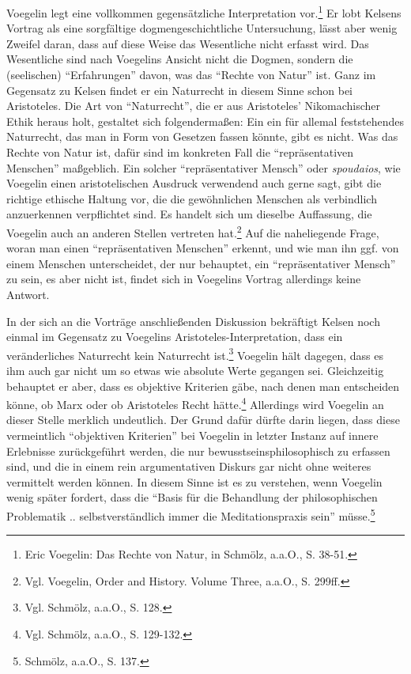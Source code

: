 \documentclass[12pt,a4paper,ngerman]{article}
\begin{document}
Voegelin legt eine vollkommen gegensätzliche Interpretation
vor.\footnote{Eric Voegelin: Das Rechte von Natur, in Schmölz, a.a.O.,
  S. 38-51.} Er lobt Kelsens Vortrag als eine sorgfältige
dogmengeschichtliche Untersuchung, lässt aber wenig Zweifel daran,
dass auf diese Weise das Wesentliche nicht erfasst wird. Das
Wesentliche sind nach Voegelins Ansicht nicht die Dogmen, sondern die
(seelischen) "`Erfahrungen"' davon, was das "`Rechte von Natur"' ist.
Ganz im Gegensatz zu Kelsen findet er ein Naturrecht in diesem Sinne
schon bei Aristoteles. Die Art von "`Naturrecht"', die er aus
Aristoteles' Nikomachischer Ethik heraus holt, gestaltet sich
folgendermaßen: Ein ein für allemal feststehendes Naturrecht, das man
in Form von Gesetzen fassen könnte, gibt es nicht. Was das Rechte von
Natur ist, dafür sind im konkreten Fall die "`repräsentativen
Menschen"' maßgeblich. Ein solcher "`repräsentativer Mensch"' oder
{\em spoudaios}, wie Voegelin einen aristotelischen Ausdruck
verwendend auch gerne sagt, gibt die richtige ethische Haltung vor,
die die gewöhnlichen Menschen als verbindlich anzuerkennen
verpflichtet sind. Es handelt sich um dieselbe Auffassung, die
Voegelin auch an anderen Stellen vertreten hat.\footnote{Vgl.
  Voegelin, Order and History. Volume Three, a.a.O., S. 299ff.} Auf
die naheliegende Frage, woran man einen "`repräsentativen Menschen"'
erkennt, und wie man ihn ggf. von einem Menschen unterscheidet, der
nur behauptet, ein "`repräsentativer Mensch"' zu sein, es aber nicht
ist, findet sich in Voegelins Vortrag allerdings keine Antwort.

In der sich an die Vorträge anschließenden Diskussion bekräftigt Kelsen noch
einmal im Gegensatz zu Voegelins Aristoteles-Interpretation, dass ein
veränderliches Naturrecht kein Naturrecht ist.\footnote{Vgl. Schmölz, a.a.O.,
  S. 128.} Voegelin hält dagegen, dass es ihm auch gar nicht um so etwas wie
absolute Werte gegangen sei. Gleichzeitig behauptet er aber, dass es objektive
Kriterien gäbe, nach denen man entscheiden könne, ob Marx oder ob Aristoteles
Recht hätte.\footnote{Vgl. Schmölz, a.a.O., S. 129-132.} Allerdings wird
Voegelin an dieser Stelle merklich undeutlich. Der Grund dafür dürfte darin
liegen, dass diese vermeintlich "`objektiven Kriterien"' bei Voegelin in
letzter Instanz auf innere Erlebnisse zurückgeführt werden, die nur
bewusstseinsphilosophisch zu erfassen sind, und die in einem rein
argumentativen Diskurs gar nicht ohne weiteres vermittelt werden können. In
diesem Sinne ist es zu verstehen, wenn Voegelin wenig später fordert, dass die
"`Basis für die Behandlung der philosophischen Problematik ..
selbstverständlich immer die Meditationspraxis sein"' müsse.\footnote{Schmölz,
  a.a.O., S. 137.}
\end{document}
